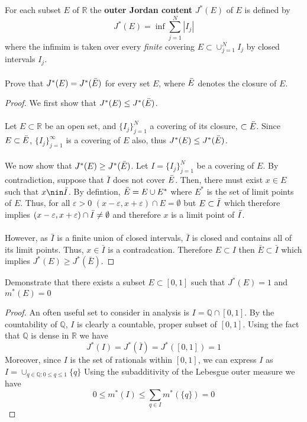 \documentclass[nocolor]{report}
\begin{document}
\newpage
\begin{ex}[Question 3. a] For each subset $E$ of $\mathbb{R}$ the \textbf{outer Jordan content} $J^*(E)$ of $E$ is defined by
$$J^*(E) = \inf\sum_{j=1}^{N}|I_j|$$
where the infimim is taken over every \textit{finite} covering $E\subset \cup_{j=1}^{N}I_j$ by closed intervals $I_j$. \\
\\
Prove that $J^*(E) = J^*(\Bar{E})$ for every set $E$, where $\Bar{E}$ denotes the closure of $E$.
\end{ex}
\begin{proof} We first show that $J^*(E) \leq J^*(\Bar{E})$.\\ 
\\
Let $E\subset\mathbb{R}$ be an open set, and $\{I_j\}_{j=1}^{N}$ a covering of its closure, $\subset\Bar{E}$. Since $E\subset\Bar{E}$, $\{I_j\}_{j=1}^{\infty}$ is a covering of $E$ also, thus $J^*(E)\leq J^*(\Bar{E})$. \\
\\
We now show that $J^*(E) \geq J^*(\Bar{E})$. Let $I = \{I_j\}_{j=1}^{N}$ be a covering of $E$. By contradiction, suppose that $\bar{I}$ does not cover $\Bar{E}$. Then, there must exist $x\in E$ such that $x\nin \Bar{I}$. By defintion, $\Bar{E} = E \cup E^*$ where $E^*$ is the set of limit points of $E$. Thus, for all $\varepsilon>0$ $(x-\varepsilon, x+\varepsilon)\cap E = \emptyset$ but $E\subset\Bar{I}$ which therefore implies $(x-\varepsilon, x+\varepsilon)\cap \Bar{I} \neq \emptyset$ and therefore $x$ is a limit point of $\Bar{I}$. \\
\\
However, as $\bar{I}$ is a finite union of closed intervals, $\bar{I}$ is closed and contains all of its limit points. Thus, $x\in\bar{I}$ is a contradcation. Therefore $E\subset I$ then $\bar{E}\subset\bar{I}$ which implies $J^*(E)\geq J^*(\bar{E})$.
\end{proof}
\begin{ex}[Question 3. b]
    Demonstrate that there exists a subset $E\subset[0,1]$ such that $J^*(E)=1$ and $m^*(E)=0$
\end{ex}
\begin{proof}
     An often useful set to consider in analysis is $I = \mathbb{Q}\cap[0,1]$. By the countability of $\mathbb{Q}$, $I$ is clearly a countable, proper subset of $[0,1]$. Using the fact that $\mathbb{Q}$ is dense in $\mathbb{R}$ we have 
$$J^*(I) = J^*(\bar{I}) = J^*([0,1]) = 1$$
Moreover, since $I$ is the set of rationals within $[0,1]$, we can express $I$ as  $I = \cup_{q\in \mathbb{Q}: 0\leq q\leq 1}\{q\}$ Using the subadditivity of the Lebesgue outer measure we have 
$$0\leq m^*(I) \leq \sum_{q\in I} m^*(\{q\}) = 0$$
\end{proof}
\end{document}
